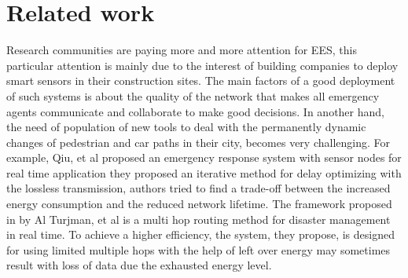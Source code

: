 \section{Related work} \label{sec:Related work}

Research communities are paying more and more attention for \ac{EES},
	this particular attention is mainly due to the interest of building companies to deploy smart sensors in their construction sites.
The main factors of a good deployment of such systems is about the quality of the network that makes all emergency agents communicate and collaborate to make good decisions.
In another hand,
	the need of population of new tools to deal with the permanently dynamic changes of pedestrian and car paths in their city,
	becomes very challenging.
For example,
	Qiu, et al \cite{qiu_ergid_2016} proposed an emergency response system with sensor nodes for real time application
	they proposed an iterative method for delay optimizing with the lossless transmission,
	authors tried to find a trade-off between the increased energy consumption and the reduced network lifetime.
The framework proposed in by Al Turjman, et al \cite{al-turjman_cognitive_2019} is a multi hop routing method for disaster management in real time.
To achieve a higher efficiency,
	the system, they propose, is designed for using limited multiple hops with the help of left over energy may sometimes result with loss of data due the exhausted energy level.






